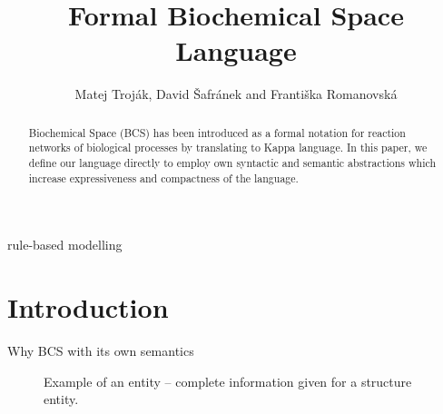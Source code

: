 \documentclass{elsarticle}
\begin{document}
\begin{frontmatter}
\title{Formal Biochemical Space Language}

\author{\normalsize
Matej Troják, David Šafránek and Františka Romanovská}
\address{Faculty of Informatics, Masaryk University\\
Brno, Czech Republic
}

\begin{abstract}
Biochemical Space (BCS) has been introduced as a formal notation for reaction networks of biological processes by translating to Kappa language. In this paper, we define our language directly to employ own syntactic and semantic abstractions which increase expressiveness and compactness of the language.
\end{abstract}

\begin{keyword}
rule-based modelling
\end{keyword}

\end{frontmatter}

\section{Introduction}

Why BCS with its own semantics

\begin{figure}[!h]
\begin{center}
\end{center}
\caption{Example of an entity -- complete information given for a structure entity.}\label{ex:structureent}
\end{figure}
\end{document}
